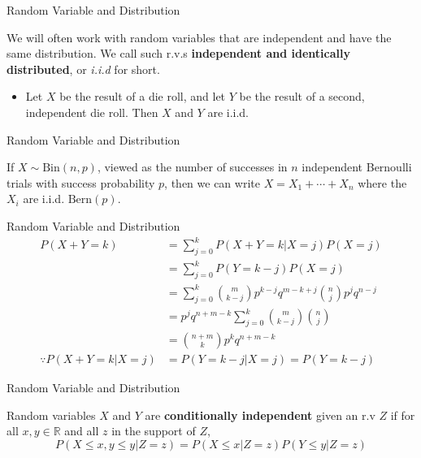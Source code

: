 \documentclass{beamer}
\newcommand{\mbb}[1]{\mathbb{#1}}
\newcommand{\tb}[1]{\textbf{#1}}
\newcommand{\ti}[1]{\textit{#1}}
\begin{document}
\begin{frame}{Random Variable and Distribution}
    \begin{definition}[i.i.d.]
        We will often work with random variables that are independent and have the same distribution. We call such r.v.s \tb{independent and identically distributed}, or \ti{i.i.d} for short.
    \end{definition}
    \begin{itemize}
        \item{Let $X$ be the result of a die roll, and let $Y$ be the result of a second, independent die roll. Then $X$ and $Y$ are i.i.d.}
    \end{itemize}
\end{frame}
\begin{frame}{Random Variable and Distribution}
    \begin{theorem}
        If $X \sim \text{Bin}(n,p)$, viewed as the number of successes in $n$ independent Bernoulli trials with success probability $p$, then we can write $X=X_1 + \cdots + X_n$ where the $X_i$ are i.i.d. $\text{Bern}(p)$.
    \end{theorem}
\end{frame}
\begin{frame}{Random Variable and Distribution}
    \[
    \begin{aligned}
        P(X+Y=k)&=\sum_{j=0}^k P(X+Y=k|X=j)P(X=j)\\
        &=\sum^k_{j=0}P(Y=k-j)P(X=j)\\
        &=\sum^k_{j=0} \binom{m}{k-j} p^{k-j} q^{m-k+j} \binom{n}{j} p^j q^{n-j}\\
        &=p^j q^{n+m-k} \sum^k_{j=0} \binom {m}{k-j}\binom{n}{j}\\
        &=\binom{n+m}{k}p^k q^{n+m-k}\\
        \because P(X+Y=k|X=j) &= P(Y=k-j|X=j)=P(Y=k-j)
    \end{aligned}
    \]

\end{frame}

\begin{frame}{Random Variable and Distribution}
    \begin{definition}
        Random variables $X$ and $Y$ are \tb{conditionally independent} given an r.v $Z$ if for all $x,y \in \mbb{R}$ and all $z$ in the support of $Z$,
        \[
        P(X\leq x, y\leq y| Z = z) = P(X \leq x|Z=z) P(Y \leq y|Z=z)
        \]
    \end{definition}
\end{frame}
\end{document}
